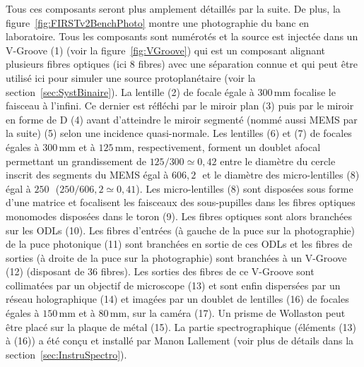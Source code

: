 Tous ces composants seront plus amplement détaillés par la suite. De plus, la figure~\ref{fig:FIRSTv2BenchPhoto} montre une photographie du banc en laboratoire. Tous les composants sont numérotés et la source est injectée dans un V-Groove (1) (voir la figure~\ref{fig:VGroove}) qui est un composant alignant plusieurs fibres optiques (ici $8$ fibres) avec une séparation connue et qui peut être utilisé ici pour simuler une source protoplanétaire (voir la section~\ref{sec:SystBinaire}). La lentille (2) de focale égale à $300 \,$mm focalise le faisceau à l'infini. Ce dernier est réfléchi par le miroir plan (3) puis par le miroir en forme de D (4) avant d'atteindre le miroir segmenté (nommé aussi \ac{MEMS} par la suite) (5) selon une incidence quasi-normale. Les lentilles (6) et (7) de focales égales à $300 \,$mm et à $125 \,$mm, respectivement, forment un doublet afocal permettant un grandissement de $125 / 300 \simeq 0,42$ entre le diamètre du cercle inscrit des segments du \ac{MEMS} égal à $606,2 \,$\um~et le diamètre des micro-lentilles (8) égal à $250 \,$\um~($250 / 606,2 \simeq 0,41$). Les micro-lentilles (8) sont disposées sous forme d'une matrice et focalisent les faisceaux des sous-pupilles dans les fibres optiques monomodes disposées dans le toron (9). Les fibres optiques sont alors branchées sur les \ac{ODL}s (10). Les fibres d'entrées (à gauche de la puce sur la photographie) de la puce photonique (11) sont branchées en sortie de ces \ac{ODL}s et les fibres de sorties (à droite de la puce sur la photographie) sont branchées à un V-Groove (12) (disposant de $36$ fibres). Les sorties des fibres de ce V-Groove sont collimatées par un objectif de microscope (13) et sont enfin dispersées par un réseau holographique (14) et imagées par un doublet de lentilles (16) de focales égales à $150 \,$mm et à $80 \,$mm, sur la caméra (17). Un prisme de Wollaston peut être placé sur la plaque de métal (15). La partie spectrographique (éléments (13) à (16)) a été conçu et installé par Manon Lallement (voir plus de détails dans la section~\ref{sec:InstruSpectro}).

